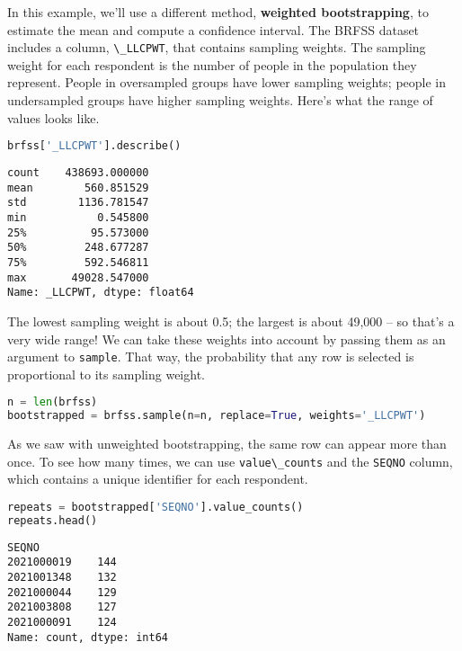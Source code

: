 In this example, we'll use a different method, \textbf{weighted
bootstrapping}, to estimate the mean and compute a confidence interval.
The BRFSS dataset includes a column, \passthrough{\lstinline!\_LLCPWT!},
that contains sampling weights. The sampling weight for each respondent
is the number of people in the population they represent. People in
oversampled groups have lower sampling weights; people in undersampled
groups have higher sampling weights. Here's what the range of values
looks like.

\begin{lstlisting}[language=Python,style=source]
brfss['_LLCPWT'].describe()
\end{lstlisting}

\begin{lstlisting}[style=output]
count    438693.000000
mean        560.851529
std        1136.781547
min           0.545800
25%          95.573000
50%         248.677287
75%         592.546811
max       49028.547000
Name: _LLCPWT, dtype: float64
\end{lstlisting}

The lowest sampling weight is about 0.5; the largest is about 49,000 --
so that's a very wide range! We can take these weights into account by
passing them as an argument to \passthrough{\lstinline!sample!}. That
way, the probability that any row is selected is proportional to its
sampling weight.

\begin{lstlisting}[language=Python,style=source]
n = len(brfss)
bootstrapped = brfss.sample(n=n, replace=True, weights='_LLCPWT')
\end{lstlisting}

As we saw with unweighted bootstrapping, the same row can appear more
than once.
To see how many times, we can use
\passthrough{\lstinline!value\_counts!} and the
\passthrough{\lstinline!SEQNO!} column, which contains a unique
identifier for each respondent.

\pagebreak

\begin{lstlisting}[language=Python,style=source]
repeats = bootstrapped['SEQNO'].value_counts()
repeats.head()
\end{lstlisting}

\begin{lstlisting}[style=output]
SEQNO
2021000019    144
2021001348    132
2021000044    129
2021003808    127
2021000091    124
Name: count, dtype: int64
\end{lstlisting}

